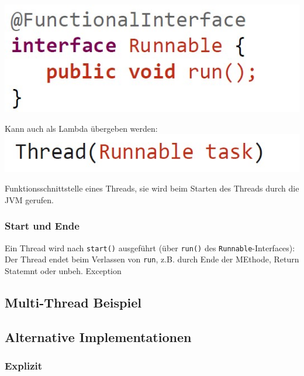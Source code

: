 \begin{minipage}{0.48\columnwidth}
    \includegraphics[width=\linewidth]{pictures/runnable-interface.jpg}
\end{minipage}
\hfill
\begin{minipage}{0.48\columnwidth}
    Kann auch als Lambda übergeben werden:\\
    \includegraphics[width=\linewidth]{pictures/runnable-lambda.jpg}
\end{minipage}
Funktionsschnittstelle eines Threads, sie wird beim Starten des Threads durch die JVM gerufen.

\subsubsection{Start und Ende}
Ein Thread wird nach \verb|start()| ausgeführt (über \verb|run()| des \verb|Runnable|-Interfaces):\\


Der Thread endet beim Verlassen von \verb|run|, z.B. durch Ende der MEthode, Return Statemnt oder unbeh. Exception

\subsection{Multi-Thread Beispiel}


\subsection{Alternative Implementationen}
\subsubsection{Explizit}


